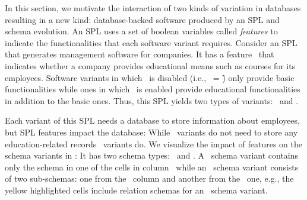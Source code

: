 
In this section, we motivate the interaction of two kinds of variation in databases 
resulting in a new kind:
database-backed software produced by an SPL and schema evolution.
An SPL uses a set of boolean variables called \emph{features} 
to indicate the functionalities that each software variant requires.
Consider an SPL that generates management software for companies. 
It has a feature \edu\ that 
indicates whether a company
provides educational means such as courses for its 
employees.
Software variants in which \edu\ is disabled (i.e., \edu\ = \f) only provide basic 
functionalities while ones in which \edu\ is enabled provide educational functionalities
in addition to the basic ones. Thus, this SPL yields two types of variants:
\basic\ and \educational.

Each variant of this SPL needs a database to store information
about employees, but SPL features impact the database: While
\basic\ variants do not need to store any education-related records 
\educational\ variants do. 
We visualize the impact of features on the schema variants in :
It has two
schema types: \basic\ and \educational.
A \basic\ schema variant contains only the schema in one of the cells in column \basic\
while an \educational\ schema variant consists of two sub-schemas: one from the \basic\
column and another from the \educational\ one, e.g., 
the yellow highlighted cells include relation schemas for an \educational\ schema variant. 

